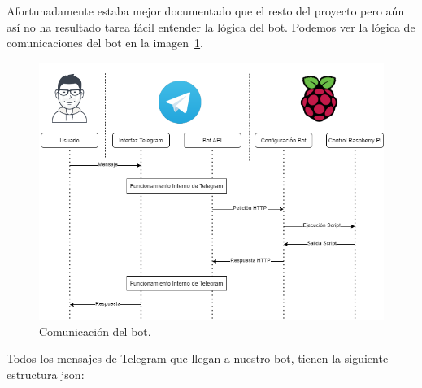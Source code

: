 Afortunadamente estaba mejor documentado que el resto del proyecto pero aún así no ha resultado tarea fácil entender la lógica del bot. 
Podemos ver la lógica de comunicaciones del bot en la imagen~\ref{Img:FuncionamientoBot}. 

\begin{figure}
    \centering
    \includegraphics[width=1.0\textwidth]{img/Diagramas/FuncionamientoBot.png}
    \caption{Comunicación del bot. } \label{Img:FuncionamientoBot}
\end{figure}

Todos los mensajes de Telegram que llegan a nuestro bot, tienen la siguiente estructura json:

